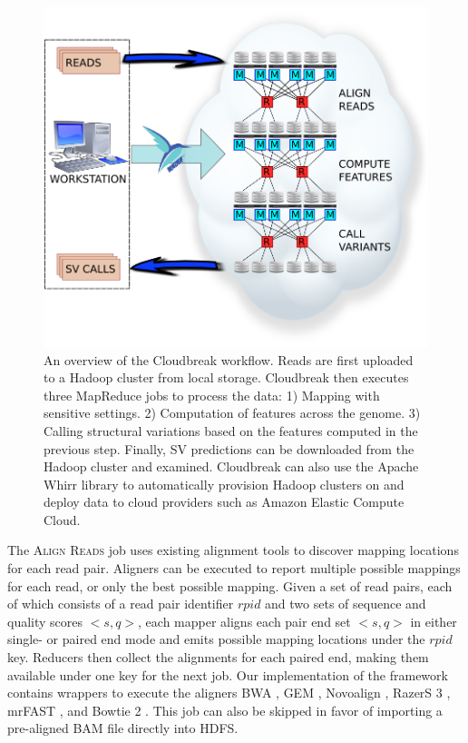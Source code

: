 \begin{figure}
\centering
\includegraphics[width=.8\textwidth]{figures/workflow_with_whirr.png}
\caption{An overview of the Cloudbreak workflow. Reads are first uploaded to a Hadoop cluster from local storage. Cloudbreak then executes three MapReduce jobs to process the data: 1) Mapping with sensitive settings. 2) Computation of features across the genome. 3) Calling structural variations based on the features computed in the previous step. Finally, SV predictions can be downloaded from the Hadoop cluster and examined. Cloudbreak can also use the Apache Whirr library to automatically provision Hadoop clusters on and deploy data to cloud providers such as Amazon Elastic Compute Cloud.}
\label{cloudbreak_workflow}
\end{figure}


The \textsc{Align Reads} job uses existing alignment tools to discover mapping locations for each read pair. Aligners can be executed to report multiple possible mappings for each read, or only the best possible mapping. Given a set of read pairs, each of which consists of a read pair identifier $rpid$ and two sets of sequence and quality scores $<s,q>$, each mapper aligns each pair end set $<s,q>$ in either single- or paired end mode and emits possible mapping locations under the $rpid$ key. Reducers then collect the alignments for each paired end, making them available under one key for the next job. Our implementation of the framework contains wrappers to execute the aligners BWA \cite{Li:2009p836}, GEM \cite{MarcoSola:2012hm}, Novoalign \cite{novoalign}, RazerS 3 \cite{Weese:2012by}, mrFAST \cite{Alkan:2009cr}, and Bowtie 2 \cite{Langmead:2012jh}. This job can also be skipped in favor of importing a pre-aligned BAM file directly into HDFS.

